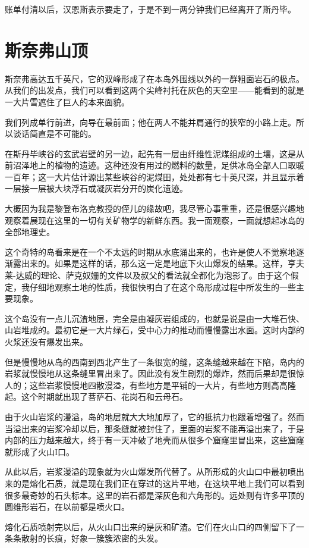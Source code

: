 \documentclass[10pt]{book}
\begin{document}
账单付清以后，汉恩斯表示要走了，于是不到一两分钟我们已经离开了斯丹毕。
\chapter{斯奈弗山顶}
斯奈弗高达五千英尺，它的双峰形成了在本岛外围线以外的一群粗面岩石的极点。从我们的出发点，我们可以看到这两个尖峰衬托在灰色的天空里——能看到的就是一大片雪遮住了巨人的本来面貌。

我们列成单行前进，向导在最前面；他在两人不能并肩通行的狭窄的小路上走。所以谈话简直是不可能的。

在斯丹毕峡谷的玄武岩壁的另一边，起先有一层由纤维性泥煤组成的土壤，这是从前沼泽地上的植物的遗迹。这种还没有用过的燃料的数量，足供冰岛全部人口取暖一百年；这一大片估计源出某些峡谷的泥煤田，处处都有七十英尺深，并且显示着一层接一层被大块浮石或凝灰岩分开的炭化遗迹。

大概因为我是黎登布洛克教授的侄儿的缘故吧，我尽管心事重重，还是很感兴趣地观察着展现在这里的一切有关矿物学的新鲜东西。我一面观察，一面就想起冰岛的全部地理史。

这个奇特的岛看来是在一个不太远的时期从水底涌出来的，也许是使人不觉察地逐渐露出来的。如果是这样的话，那么这一定是地底下火山爆发的结果。这样，亨夫莱-达威的理论、萨克奴姗的文件以及叔父的看法就全都化为泡影了。由于这个假定，我仔细地观察土地的性质，我很快明白了在这个岛形成过程中所发生的一些主要现象。

这个岛没有一点儿沉渣地层，完全是由凝灰岩组成的，也就是说是由一大堆石快、山岩堆成的。最初它是一大片绿石，受中心力的推动而慢慢露出水面。这时内部的火浆还没有爆发出来。

但是慢慢地从岛的西南到西北产生了一条很宽的缝，这条缝越来越在下陷，岛内的岩浆就慢慢地从这条缝里冒出来了。因此没有发生剧烈的爆炸，然而后果却是很惊人的；这些岩浆慢慢地四散漫溢，有些地方是平铺的一大片，有些地方则高高隆起。这个时期就出现了菩萨石、花岗石和云母石。

由于火山岩浆的漫溢，岛的地层就大大地加厚了，它的抵抗力也跟着增强了。然而当溢出来的岩浆冷却以后，那条缝就被封住了，里面的岩浆不能再溢出来了，于是内部的压力越来越大，终于有一天冲破了地壳而从很多个窟窿里冒出来，这些窟窿就形成了火山I口。

从此以后，岩浆漫溢的现象就为火山爆发所代替了。从所形成的火山口中最初喷出来的是熔化石质，就是现在我们正在穿过的这片平地，在这块平地上我们可以看到很多最奇妙的石头标本。这里的岩石都是深灰色和六角形的。远处则有许多平顶的圆维形岩石，在以前都是喷火口。

熔化石质喷射完以后，从火山口出来的是灰和矿渣。它们在火山口的四侧留下了一条条散射的长痕，好象一簇簇浓密的头发。
\end{document}
